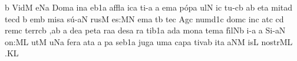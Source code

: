 \initiumgregorianum
\znotes\fissum{1pt}\bmolle b\en
%
\sgn V{i}{d}\punctum M\egn
\sgn {}e{}\pes Na\egn
\spatium
\begingroup
\bgenerale
\sgn Do{m}\punctum a\egn
\sgn {}i{n}\punctum a\egn
\sgn {}e{}\episem b1\punctum a\egn
\spatium
\sgn {}a{ffl}\punctum a\egn
\sgn {}ic\punctum a\egn
\sgn ti{-}\punctum a\egn
{}\punctum a\egn
\sgn {}em\punctum a\egn
\spatium
\sgn p{\'o}{p}\punctum a\egn
\sgn {}u{l}\punctum N\egn
\sgn {}i{}\punctum c\egn
\spatium
\sgn t{u}{-}\clivis cb\egn
{}\punctum a\augmentum b\egn
\spatium
\divisiominor
\spatium
\sgn {}et\punctum a\egn
\spatium
\sgn m{i}t\pes ad\egn
\sgn te{}\punctum c\augmentum d\egn
\spatium
\custos b
\lineaproxima
{}em\punctum b\egn
\spatium
\sgn mis\punctum a\egn
\sgn s{\'u}{-}\clivis aN\egn
\sgn rus\punctum M\egn
\spatium
\sgn {}e{s:}\punctum M\augmentum N\egn
\spatium
\divisiomaior
\spatium
\sgn {}e{m}\punctum a\egn
\sgn {}{\'\i}t\punctum b\egn
\sgn te{}\punctum c\egn
\spatium
\sgn {}Ag\punctum c\egn
\sgn num\episem d1\punctum c\egn
\spatium
\sgn dom\punctum c\egn
\sgn {}in\punctum c\egn
\sgn {}at\punctum c\egn
{}\pes cd\egn
\sgn rem\punctum c\egn
\spatium
\sgn t{e}{rr}\clivis cb\egn
\sgn {}{\ae},\punctum a\augmentum b\egn
\spatium
\divisiominor
\spatium
\custos a
\lineaproxima
\sgn de{}\punctum a\egn
\spatium
\sgn p{e}t\punctum a\egn
\sgn ra{}\punctum a\egn
\spatium
\sgn de{s}\punctum a\egn
{}r\punctum a\egn
\sgn ti{}\episem b1\punctum a\egn
\spatium
\sgn {}ad\punctum a\egn
\spatium
\sgn m{o}n\punctum a\egn
\sgn tem\punctum a\egn
\spatium
\sgn f{\'\i}{l}\pes Nb\egn
\sgn {}i{-}\punctum a\egn
\sgn {}{\ae}{}\punctum a\egn
\spatium
\sgn S{i}{-}\clivis aN\egn
\sgn {}o{n:}\punctum M\augmentum L\egn
\spatium
\divisiomaior
\spatium
\sgn {}ut\punctum M\egn
\spatium
{}u\pes Na\egn
\sgn fe{r}\punctum a\egn
\sgn {}at\punctum a\egn
\spatium
\custos a
\lineaproxima
{}p\punctum a\egn
\sgn se{}\episem b1\punctum a\egn
\spatium
\sgn j{u}{g}\punctum a\egn
\sgn {}um\punctum a\egn
\spatium
\sgn cap\punctum a\egn
\sgn ti{v}\pes ab\egn
\sgn {}i{t}\punctum a\egn
{}\climacus aNM\egn
{}is\punctum L\egn
\spatium
\sgn n{o}{str}\clivis ML\egn
\sgn {}{\ae}.\punctum K\augmentum L\egn
\endgroup
\Finisgregoriana


